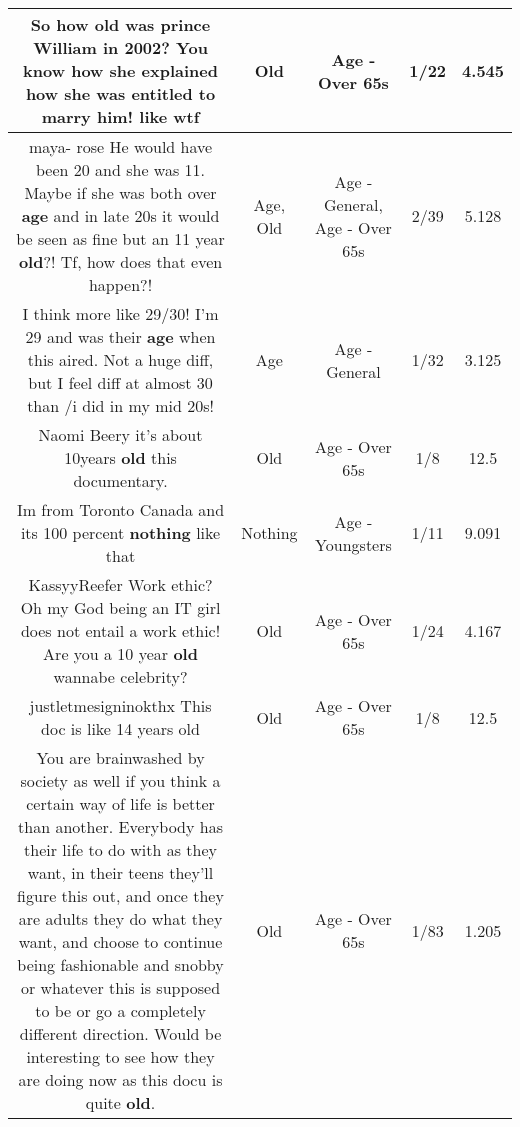 \documentclass[11pt]{article}
\newlength\mylength
\begin{document}
\begin{center}
\begin{longtable}{|C{.65\mylength}|C{.30\mylength}|C{.12\mylength}|C{.12\mylength}|C{.12\mylength}|}
  \small So how \textbf{old} was prince William in 2002?    You know how she explained how she was entitled to marry him! like wtf\normalsize   & Old & Age - Over 65s & 1/22 & 4.545 \\  \hline
  \small maya- rose He would have been 20 and she was 11. Maybe if she was both over \textbf{age} and in late 20s it would be seen as fine but an 11 year \textbf{old}?! Tf, how does that even happen?!\normalsize   & Age, Old & Age - General, Age - Over 65s & 2/39 & 5.128 \\  \hline
  \small I think more like 29/30! I'm 29 and was their \textbf{age} when this aired. Not a huge diff, but I feel diff at almost 30 than /i did in my mid  20s!\normalsize   & Age & Age - General & 1/32 & 3.125 \\  \hline
  \small Naomi Beery it's about 10years \textbf{old} this documentary.\normalsize   & Old & Age - Over 65s & 1/8 & 12.5 \\  \hline
  \small Im from Toronto Canada and its 100 percent \textbf{nothing} like that\normalsize   & Nothing & Age - Youngsters & 1/11 & 9.091 \\  \hline
  \small KassyyReefer Work ethic? Oh my God being an IT girl does not entail a work ethic! Are you a 10 year \textbf{old} wannabe celebrity?\normalsize   & Old & Age - Over 65s & 1/24 & 4.167 \\  \hline
  \small justletmesigninokthx This doc is like 14 years old\normalsize   & Old & Age - Over 65s & 1/8 & 12.5 \\  \hline
  \small You are brainwashed by society as well if you think a certain way of life is better than another. Everybody has their life to do with as they want, in their teens they'll figure this out, and once they are adults they do what they want, and choose to continue being fashionable and snobby or whatever this is supposed to be or go a completely different direction. Would be interesting to see how they are doing now as this docu is quite \textbf{old}.\normalsize   & Old & Age - Over 65s & 1/83 & 1.205 \\  \hline
  
\end{longtable}
\end{center}
\end{document}

